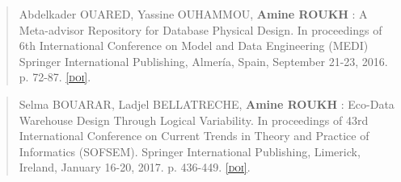 \begin{quote}
	\cite{Ouared16} Abdelkader OUARED, Yassine OUHAMMOU, \textbf{Amine ROUKH} : A Meta-advisor Repository for Database Physical Design. In proceedings of 6th International Conference on Model and Data Engineering (MEDI) Springer International Publishing, Almería, Spain, September 21-23, 2016. p. 72-87. \href{http://dx.doi.org/10.1007/978-3-319-45547-1_6}{\textsc{[doi]}}.
\end{quote}

\begin{quote}
	\cite{Bouarar17} Selma BOUARAR, Ladjel BELLATRECHE, \textbf{Amine ROUKH} : Eco-Data Warehouse Design Through Logical Variability. In proceedings of 43rd International Conference on Current Trends in Theory and Practice of Informatics (SOFSEM). Springer International Publishing, Limerick, Ireland, January 16-20, 2017. p. 436-449. \href{http://dx.doi.org/10.1007/978-3-319-51963-0_34}{\textsc{[doi]}}.
\end{quote}

